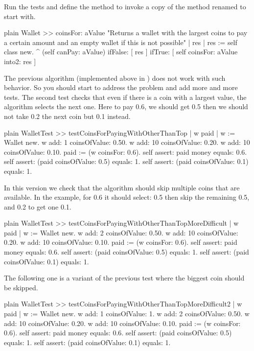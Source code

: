 \documentclass[10pt,twoside,english]{_support/latex/sbabook/sbabook}
\begin{document}
Run the tests and define the method  to invoke a copy  of the method  renamed  to start with. 

\begin{displaycode}{plain}
Wallet >> coinsFor: aValue
	"Returns a wallet with the largest coins to pay a certain amount and an empty wallet if this is not possible"
	| res |
	res := self class new.
	^ (self canPay: aValue)
		ifFalse: [ res ]
		ifTrue: [ self coinsFor: aValue into2: res ] 
\end{displaycode}

	
The previous algorithm (implemented above in ) does not work with such behavior. So you should start to address the problem and add more and more tests. The second test checks that even if there is a coin with a largest value, the algorithm selects the next
one. Here to pay 0.6, we should get 0.5 then we should not take 0.2 the next coin but 0.1 instead.

\begin{displaycode}{plain}
WalletTest >> testCoinsForPayingWithOtherThanTop
	| w paid | 
	w := Wallet new.
	w add: 1 coinsOfValue: 0.50.
	w add: 10 coinsOfValue: 0.20.
	w add: 10 coinsOfValue: 0.10.
	paid := (w coinsFor: 0.6).
	self assert: paid money equals: 0.6.
	self assert: (paid coinsOfValue: 0.5) equals: 1.
	self assert: (paid coinsOfValue: 0.1) equals: 1.
\end{displaycode}

In this version we check that the algorithm should skip multiple coins that are available. In the example, for 0.6 it should select: 0.5 then skip the remaining 0.5, and 0.2 to get one 0.1.

\begin{displaycode}{plain}
WalletTest >> testCoinsForPayingWithOtherThanTopMoreDifficult
	| w paid | 
	w := Wallet new.
	w add: 2 coinsOfValue: 0.50.
	w add: 10 coinsOfValue: 0.20.
	w add: 10 coinsOfValue: 0.10.
	paid := (w coinsFor: 0.6).
	self assert: paid money equals: 0.6.
	self assert: (paid coinsOfValue: 0.5) equals: 1.
	self assert: (paid coinsOfValue: 0.1) equals: 1.
\end{displaycode}

The following one is a variant of the previous test where the biggest coin should be skipped. 

\begin{displaycode}{plain}
WalletTest >> testCoinsForPayingWithOtherThanTopMoreDifficult2
	| w paid | 
	w := Wallet new.
	w add: 1 coinsOfValue: 1.
	w add: 2 coinsOfValue: 0.50.
	w add: 10 coinsOfValue: 0.20.
	w add: 10 coinsOfValue: 0.10.
	paid := (w coinsFor: 0.6).
	self assert: paid money equals: 0.6.
	self assert: (paid coinsOfValue: 0.5) equals: 1.
	self assert: (paid coinsOfValue: 0.1) equals: 1.
\end{displaycode}
\end{document}
